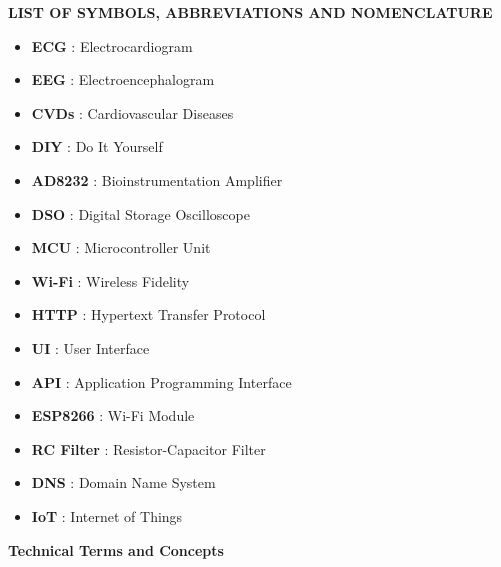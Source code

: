 
\begin{center}
  \textbf{LIST OF SYMBOLS, ABBREVIATIONS AND NOMENCLATURE} 
\end{center}

\begin{itemize}
  \item[] \textbf{ECG}  : Electrocardiogram
  \item[] \textbf{EEG}  : Electroencephalogram
  \item[] \textbf{CVDs} : Cardiovascular Diseases
  \item[] \textbf{DIY}  : Do It Yourself
  \item[] \textbf{AD8232} : Bioinstrumentation Amplifier
  \item[] \textbf{DSO}  : Digital Storage Oscilloscope
  \item[] \textbf{MCU}  : Microcontroller Unit
  \item[] \textbf{Wi-Fi} : Wireless Fidelity
  \item[] \textbf{HTTP} : Hypertext Transfer Protocol
  \item[] \textbf{UI}   : User Interface
  \item[] \textbf{API}  : Application Programming Interface
  \item[] \textbf{ESP8266} : Wi-Fi Module
  \item[] \textbf{RC Filter} : Resistor-Capacitor Filter
  \item[] \textbf{DNS}  : Domain Name System
  \item[] \textbf{IoT}  : Internet of Things
\end{itemize}

\vspace{0.5cm}

\begin{center}
  \textbf{Technical Terms and Concepts} 
\end{center}

